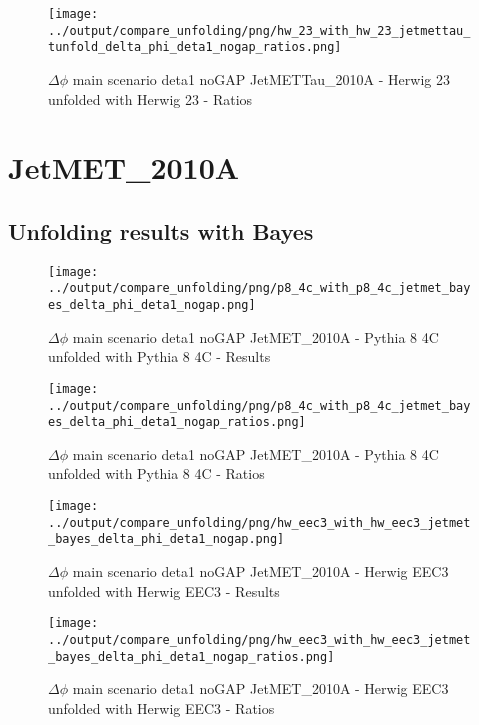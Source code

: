 \documentclass[11pt]{book}
\begin{document}
\begin{figure}[ht]
\centering
\texttt{[image: ../output/compare\_unfolding/png/hw\_23\_with\_hw\_23\_jetmettau\_tunfold\_delta\_phi\_deta1\_nogap\_ratios.png]}
\caption{$\Delta\phi$ main scenario deta1 noGAP JetMETTau\_2010A - Herwig 23 unfolded with Herwig 23 - Ratios}
\label{hw_23_hw_23_jetmettau_tunfold_delta_phi_deta1_nogap_b}
\end{figure}


\section{JetMET\_2010A}
\subsection{Unfolding results with Bayes}

\begin{figure}[ht]
\centering
\texttt{[image: ../output/compare\_unfolding/png/p8\_4c\_with\_p8\_4c\_jetmet\_bayes\_delta\_phi\_deta1\_nogap.png]}
\caption{$\Delta\phi$ main scenario deta1 noGAP JetMET\_2010A - Pythia 8 4C unfolded with Pythia 8 4C - Results}
\label{p8_p8_jetmet_bayes_delta_phi_deta1_nogap_a}
\end{figure}

\begin{figure}[ht]
\centering
\texttt{[image: ../output/compare\_unfolding/png/p8\_4c\_with\_p8\_4c\_jetmet\_bayes\_delta\_phi\_deta1\_nogap\_ratios.png]}
\caption{$\Delta\phi$ main scenario deta1 noGAP JetMET\_2010A - Pythia 8 4C unfolded with Pythia 8 4C - Ratios}
\label{p8_p8_jetmet_bayes_delta_phi_deta1_nogap_b}
\end{figure}

\begin{figure}[ht]
\centering
\texttt{[image: ../output/compare\_unfolding/png/hw\_eec3\_with\_hw\_eec3\_jetmet\_bayes\_delta\_phi\_deta1\_nogap.png]}
\caption{$\Delta\phi$ main scenario deta1 noGAP JetMET\_2010A - Herwig EEC3 unfolded with Herwig EEC3 - Results}
\label{hw_eec3_hw_eec3_jetmet_bayes_delta_phi_deta1_nogap_a}
\end{figure}

\begin{figure}[ht]
\centering
\texttt{[image: ../output/compare\_unfolding/png/hw\_eec3\_with\_hw\_eec3\_jetmet\_bayes\_delta\_phi\_deta1\_nogap\_ratios.png]}
\caption{$\Delta\phi$ main scenario deta1 noGAP JetMET\_2010A - Herwig EEC3 unfolded with Herwig EEC3 - Ratios}
\label{hw_eec3_hw_eec3_jetmet_bayes_delta_phi_deta1_nogap_b}
\end{figure}
\end{document}

